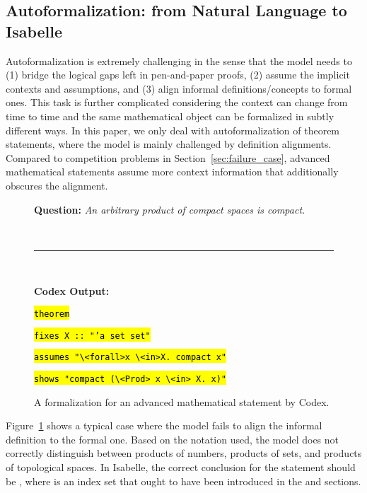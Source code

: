 \documentclass{article}
\begin{document}
\subsection{Autoformalization: from Natural Language to Isabelle}
Autoformalization is extremely challenging in the sense that the model needs to (1) bridge the logical gaps left in pen-and-paper proofs, (2) assume the implicit contexts and assumptions, and (3) align informal definitions/concepts to formal ones. This task is further complicated considering the context can change from time to time and the same mathematical object can be formalized in subtly different ways. In this paper, we only deal with autoformalization of theorem statements, where the model is mainly challenged by definition alignments. Compared to competition problems in Section~\ref{sec:failure_case}, advanced mathematical statements assume more context information that additionally obscures the alignment.



\begin{figure}
\begin{boxB}
\textbf{Question:} 
\emph{An arbitrary product of compact spaces is compact.} 

\
\hrule
\

\textbf{Codex Output:}

\hl{\texttt{theorem}}
  
  \hspace{12pt}\hl{\texttt{fixes X :: "'a set set"}}
  
  \hspace{12pt}\hl{\texttt{assumes "\textbackslash<forall>x \textbackslash<in>X. compact x"}}
  
  \hspace{12pt}\hl{\texttt{shows "compact (\textbackslash<Prod> x \textbackslash<in> X. x)"}}
\end{boxB}
\caption{A formalization for an advanced mathematical statement by Codex.}
\label{fig:formal_advanced}
\vspace{-10pt}
\end{figure}
Figure~\ref{fig:formal_advanced} shows a typical case where the model fails to align the informal definition to the formal one. Based on the notation used, the model does not correctly distinguish between products of numbers, products of sets, and products of topological spaces. In Isabelle, the correct conclusion for the statement should be , where
 is an index set that ought to have been introduced in the \isa{fixes} and \isa{assumes} sections.
\end{document}
